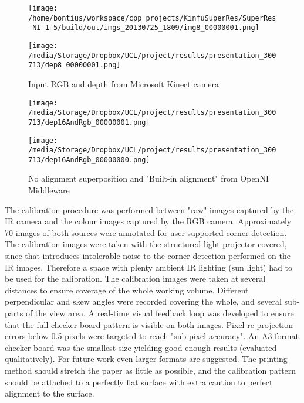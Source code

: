 \documentclass{ucl_thesis}
\begin{document}
\begin{figure}[h!]\centering
    \begin{minipage}[b]{0.49\linewidth}
        \texttt{[image: /home/bontius/workspace/cpp\_projects/KinfuSuperRes/SuperRes-NI-1-5/build/out/imgs\_20130725\_1809/img8\_00000001.png]}
    \end{minipage}
    \begin{minipage}[b]{0.49\linewidth}
        \texttt{[image: /media/Storage/Dropbox/UCL/project/results/presentation\_300713/dep8\_00000001.png]}
    \end{minipage}
    \caption{Input RGB and depth from Microsoft Kinect camera}
    \label{fig:input}
\end{figure}

\begin{figure}[h!]\centering
	\begin{minipage}[b]{0.49\linewidth}
		\texttt{[image: /media/Storage/Dropbox/UCL/project/results/presentation\_300713/dep16AndRgb\_00000001.png]}
	\end{minipage}
	\begin{minipage}[b]{0.49\linewidth}
		\texttt{[image: /media/Storage/Dropbox/UCL/project/results/presentation\_300713/dep16AndRgb\_00000000.png]}
	\end{minipage}
	\caption{No alignment superposition and "Built-in alignment" from OpenNI Middleware}
	\label{fig:calib_built_in}
\end{figure}

\par The calibration procedure was performed between "raw" images captured by the IR camera and the colour images captured by the RGB camera. Approximately 70 images of both sources were annotated for user-supported corner detection. The calibration images were taken with the structured light projector covered, since that introduces intolerable noise to the corner detection performed on the IR images. Therefore a space with plenty ambient IR lighting (sun light) had to be used for the calibration. The calibration images were taken at several distances to ensure coverage of the whole working volume. Different perpendicular and skew angles were recorded covering the whole, and several sub-parts of the view area. A real-time visual feedback loop was developed to ensure that the full checker-board pattern is visible on both images. Pixel re-projection errors below 0.5 pixels were targeted to reach "sub-pixel accuracy". An A3 format checker-board was the smallest size yielding good enough results (evaluated qualitatively). For future work even larger formats are suggested. The printing method should stretch the paper as little as possible, and the calibration pattern should be attached to a perfectly flat surface with extra caution to  perfect alignment to the surface.
\end{document}
